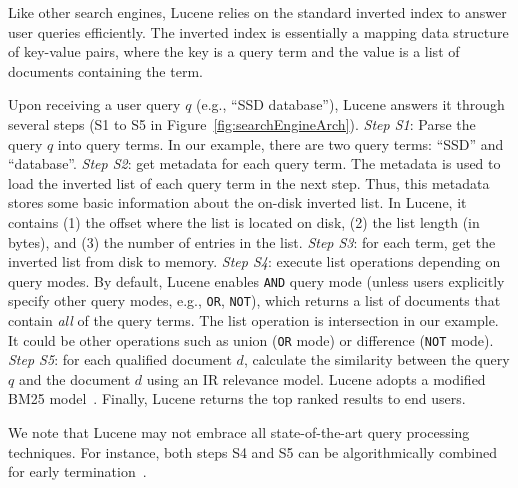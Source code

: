 
Like other search engines, Lucene relies on the standard inverted index \cite{ZM06} to answer user queries efficiently. The inverted index is essentially a mapping data structure of key-value pairs, where the key is a query term and the value is a list of documents containing the term.

Upon receiving a user query $q$ (e.g., ``SSD database''), Lucene answers it through several steps (S1 to S5 in Figure~\ref{fig:searchEngineArch}).
\emph{Step S1}: Parse the query $q$ into query terms. In our example, there are two query terms: ``SSD'' and ``database''.
\textit{Step S2}: get metadata for each query term. The metadata is used to load the inverted list of each query term in the next step. Thus, this metadata stores some basic information about the on-disk inverted list. In Lucene, it contains (1) the offset where the list is located on disk, (2) the list length (in bytes), and (3) the number of entries in the list.
\textit{Step S3}: for each term, get the inverted list from disk to memory.
\textit{Step S4}: execute list operations depending on query modes.
By default, Lucene enables \texttt{AND} query mode (unless users explicitly specify other query modes, e.g., \texttt{OR}, \texttt{NOT}), which returns a list of documents that contain \emph{all} of the query terms.
The list operation is intersection in our example. It could be other operations such as union (\texttt{OR} mode) or difference (\texttt{NOT} mode).
\textit{Step S5}: for each qualified document $d$, calculate the similarity between the query $q$ and the document $d$ using an IR relevance model. Lucene adopts a modified BM25 model~\cite{Robertson1994}. Finally, Lucene returns the top ranked results to end users.

We note that Lucene may not embrace all state-of-the-art query processing techniques. %
For instance, both steps S4 and S5 can be algorithmically combined for early termination~\cite{Broder2003EQE,Fagin2001}.




